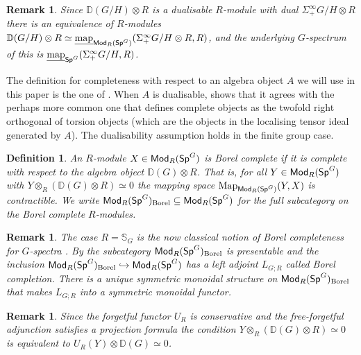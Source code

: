 \documentclass[reqno]{amsart}
\numberwithin{equation}{section}\theoremstyle{thms}
\theoremstyle{defn}
\newtheorem{defi}[equation]{Definition}
\newtheorem{rem}[equation]{Remark}
\newcommand{\bD}{\mathbb{D}}
\newcommand{\bS}{\mathbb{S}}
\newcommand{\tn}[1]{\textnormal{#1}}
\newcommand{\tsf}[1]{\textsf{\textup{#1}}}
\newcommand{\underl}[1]{\underline{#1}}
\newcommand{\Map}{\tn{Map}}
\newcommand{\imap}{\underl{\tn{map}}}
\newcommand{\Mod}{\tsf{Mod}}
\newcommand{\specg}{\tsf{Sp}^G}
\begin{document}
\begin{rem}
Since $\bD(G/H) \otimes R$ is a dualisable $R$-module with dual $\Sigma^{\infty}_+G/H \otimes R$ there is an equivalence of $R$-modules $\bD(G/H) \otimes R \simeq \imap_{\Mod_R(\specg)}(\Sigma^{\infty}_+G/H \otimes R, R)$, and the underlying $G$-spectrum of this is $\imap_{\specg}(\Sigma^{\infty}_+G/H, R)$.
\end{rem}

The definition for completeness with respect to an algebra object $A$ we will use in this paper is the one of \cite[§2.2]{mnn17}. When $A$ is dualisable, \cite[Proposition 3.11]{mnn17} shows that it agrees with the perhaps more common one that defines complete objects as the twofold right orthogonal of torsion objects (which are the objects in the localising tensor ideal generated by $A$). The dualisability assumption holds in the finite group case.

\begin{defi}\label{defi:borelcomplete}
An $R$-module $X \in \Mod_R(\specg)$ is \emph{Borel complete} if it is complete with respect to the algebra object $\bD(G) \otimes R$. That is, for all $Y \in \Mod_R(\specg)$ with $Y \otimes_R (\bD(G) \otimes R) \simeq 0$ the mapping space $\Map_{\Mod_R(\specg)}(Y,X)$ is contractible. We write $\Mod_R(\specg)_{\tn{Borel}} \subseteq \Mod_R(\specg)$ for the full subcategory on the Borel complete $R$-modules.
\end{defi}

\begin{rem}\label{rem:borelcompleteforget}
The case $R=\bS_G$ is the now classical notion of Borel completeness for $G$-spectra \cite[§6.3]{mnn17}. 
By \cite[§2.2]{mnn17} the subcategory $\Mod_R(\specg)_{\tn{Borel}}$ is presentable and the inclusion $\Mod_R(\specg)_{\tn{Borel}} \hookrightarrow \Mod_R(\specg)$ has a left adjoint $L_{G;R}$ called \emph{Borel completion}. There is a unique symmetric monoidal structure on $\Mod_R(\specg)_{\tn{Borel}}$ that makes $L_{G;R}$ into a symmetric monoidal functor.
\end{rem}

\begin{rem}\label{rem:tensorcondition}
Since the forgetful functor $U_R$ is conservative and the free-forgetful adjunction satisfies a projection formula the condition $Y \otimes_R (\bD(G) \otimes R) \simeq 0$ is equivalent to $U_R(Y) \otimes \bD(G) \simeq 0$.
\end{rem}
\end{document}
